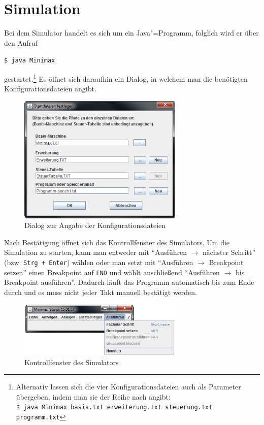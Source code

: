 \chapter{Simulation}
\label{chapter:Dokumentation-Simulation}

Bei dem Simulator handelt es sich um ein Java"=Programm, folglich wird er über den Aufruf

\texttt{\$ java Minimax}

gestartet.\footnote{Alternativ lassen sich die vier Konfigurationsdateien auch als Parameter übergeben, indem man sie der Reihe nach angibt:\\ \texttt{\$ java Minimax basis.txt erweiterung.txt steuerung.txt programm.txt}} Es öffnet sich daraufhin ein Dialog, in welchem man die benötigten Konfigurationsdateien angibt.

\begin{figure}[htb]
    \centering
    \includegraphics[width=0.7\textwidth]{dokumentation/res/minimax_load.png}
    \caption{Dialog zur Angabe der Konfigurationsdateien}
    \label{figure:Dokumentation-Simulation-Load}
\end{figure}

Nach Bestätigung öffnet sich das Kontrollfenster des Simulators. Um die Simulation zu starten, kann man entweder mit "`Ausführen $\rightarrow$ nächster Schritt"' (bzw. \texttt{Strg~+~Enter}) wählen oder man setzt mit "`Ausführen $\rightarrow$ Breakpoint setzen"' einen Breakpoint auf \texttt{END} und wählt anschließend "`Ausführen $\rightarrow$ bis Breakpoint ausführen"'. Dadurch läuft das Programm automatisch bis zum Ende durch und es muss nicht jeder Takt manuell bestätigt werden.

\begin{figure}[htb]
    \centering
    \includegraphics[width=0.7\textwidth]{dokumentation/res/minimax_run.png}
    \caption{Kontrollfenster des Simulators}
    \label{figure:Dokumentation-Simulation-Run}
\end{figure}

